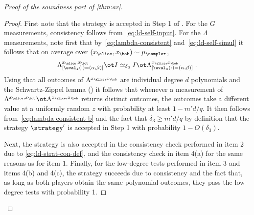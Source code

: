 \begin{proof}[Proof of the soundness part of \cref{thm:ar}]
\begin{proof}
  First note that the strategy is accepted in Step 1 of .
  For the $G$ measurements, consistency follows from~\eqref{eq:ld-self-input}.
  For the $\Lambda$ measurements, note first that
  by~\eqref{eq:lambda-consistent} and~\eqref{eq:ld-self-simul} it follows that
  on average over $(x_\alice,x_\bob)\sim \mu_\sampler$,
  \begin{equation}
    \Lambda^{{x}_\alice, {x}_\bob}_{[\eval_{z}(\cdot) = ( \alpha, \beta)]} \ot I
    \simeq_{\delta_3} I \ot \Lambda^{{x}_\alice, {x}_\bob}_{[\eval_{z}(\cdot)
      = ( \alpha, \beta)]} \;.
    \label{eq:lambda-consistent-b}
  \end{equation}
	Using that all outcomes of $\Lambda^{{x}_\alice, {x}_\bob}$ are individual degree $d$
  polynomials and the Schwartz-Zippel lemma () it
  follows that whenever a measurement of $\Lambda^{{x}_\alice, {x}_\bob}\ot
  \Lambda^{{x}_\alice, {x}_\bob}$ returns distinct outcomes, the outcomes take a
  different value at a uniformly random $z$ with probability at least $1-m'd/q$.
  It then follows from~\eqref{eq:lambda-consistent-b} and the fact that
  $\delta_3 \geq m'd/q$ by definition that the strategy $\strategy'$ is accepted
  in Step 1 with probability $1 - O(\delta_3)$.

  Next, the strategy is also accepted in the consistency check performed in item
  2 due to \eqref{eq:ld-strat-con-def}, and the consistency check in item 4(a)
  for the same reasons as for item 1.
  Finally, for the low-degree tests performed in item 3 and items 4(b) and 4(c),
  the strategy succeeds due to consistency and the fact that, as long as both
  players obtain the same polynomial outcomes, they pass the low-degree tests
  with probability 1.


\end{proof}
\end{proof}
